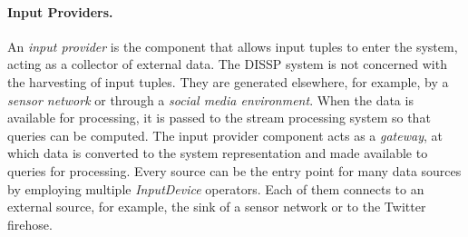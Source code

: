 \paragraph*{Input Providers.}
An \emph{input provider} is the component that allows input tuples to enter the system, acting as a
collector of external data.
The DISSP system is not concerned with the harvesting of input tuples. 
They are generated elsewhere, for example, by a \emph{sensor network} or through a \emph{social media
environment}.
When the data is available for processing, it is passed to the stream processing system so that queries
can be computed.
The input provider component acts as a \emph{gateway}, at which data is converted to the system
representation and made available to queries for processing. 
Every source can be the entry point for many data sources by employing multiple \emph{InputDevice}
operators.
Each of them connects to an external source, for example, the sink of a sensor network or to the Twitter
firehose.
% 
\vspace{-10pt}
